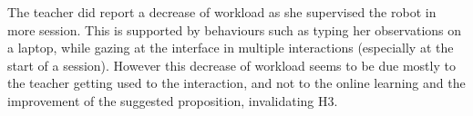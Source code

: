 The teacher did report a decrease of workload as she supervised the robot in more session. This is supported by behaviours such as typing her observations on a laptop, while gazing at the interface in multiple interactions (especially at the start of a session). However this decrease of workload seems to be due mostly to the teacher getting used to the interaction, and not to the online learning and the improvement of the suggested proposition, invalidating H3.
%
%
%
%
%
